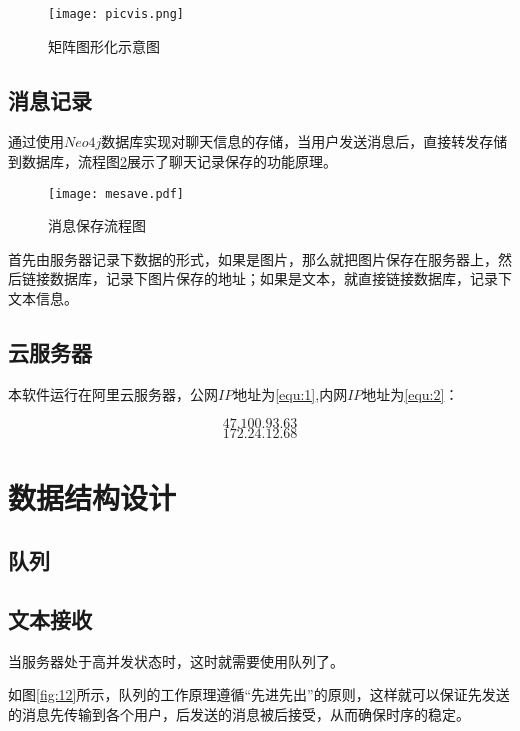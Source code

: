 \documentclass[forprint]{OSPaper}
\begin{document}
\begin{figure}[!htbp]
	\centering
	\texttt{[image: picvis.png]}
	\caption{矩阵图形化示意图}
	\label{fig:15}
\end{figure}

\section{消息记录}

通过使用$Neo4j$数据库实现对聊天信息的存储，当用户发送消息后，直接转发存储到数据库，流程图\ref{fig:13}展示了聊天记录保存的功能原理。

\begin{figure}[!htbp]
	\centering
	\texttt{[image: mesave.pdf]}
	\caption{消息保存流程图}
	\label{fig:13}
\end{figure}

首先由服务器记录下数据的形式，如果是图片，那么就把图片保存在服务器上，然后链接数据库，记录下图片保存的地址；如果是文本，就直接链接数据库，记录下文本信息。

\section{云服务器}

本软件运行在阿里云服务器，公网$IP$地址为\ref{equ:1},内网$IP$地址为\ref{equ:2}：

\begin{equation}
	\label{equ:1}
	47.100.93.63
\end{equation}
\begin{equation}
	\label{equ:2}
	172.24.12.68
\end{equation}
\clearpage
\chapter{数据结构设计}
\section{队列}

\section{文本接收}

当服务器处于高并发状态时，这时就需要使用队列了。

如图\ref{fig:12}所示，队列的工作原理遵循“先进先出”的原则，这样就可以保证先发送的消息先传输到各个用户，后发送的消息被后接受，从而确保时序的稳定。
\end{document}
